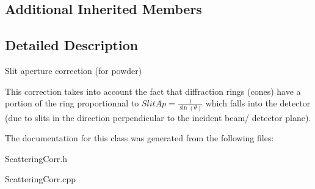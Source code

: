 \subsection*{Additional Inherited Members}


\subsection{Detailed Description}
Slit aperture correction (for powder)

This correction takes into account the fact that diffraction rings (cones) have a portion of the ring proportionnal to $ SlitAp = \frac{1}{\sin(\theta)} $ which falls into the detector (due to slits in the direction perpendicular to the incident beam/ detector plane). 

The documentation for this class was generated from the following files\+:\begin{DoxyCompactItemize}
\item 
Scattering\+Corr.\+h\item 
Scattering\+Corr.\+cpp\end{DoxyCompactItemize}
